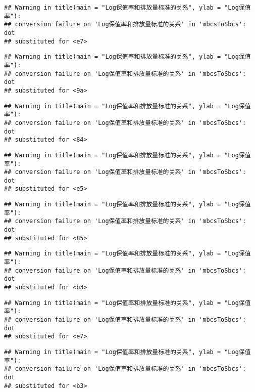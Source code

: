 \documentclass[]{article}
\begin{document}
\begin{verbatim}
## Warning in title(main = "Log保值率和排放量标准的关系", ylab = "Log保值率"):
## conversion failure on 'Log保值率和排放量标准的关系' in 'mbcsToSbcs': dot
## substituted for <e7>
\end{verbatim}

\begin{verbatim}
## Warning in title(main = "Log保值率和排放量标准的关系", ylab = "Log保值率"):
## conversion failure on 'Log保值率和排放量标准的关系' in 'mbcsToSbcs': dot
## substituted for <9a>
\end{verbatim}

\begin{verbatim}
## Warning in title(main = "Log保值率和排放量标准的关系", ylab = "Log保值率"):
## conversion failure on 'Log保值率和排放量标准的关系' in 'mbcsToSbcs': dot
## substituted for <84>
\end{verbatim}

\begin{verbatim}
## Warning in title(main = "Log保值率和排放量标准的关系", ylab = "Log保值率"):
## conversion failure on 'Log保值率和排放量标准的关系' in 'mbcsToSbcs': dot
## substituted for <e5>
\end{verbatim}

\begin{verbatim}
## Warning in title(main = "Log保值率和排放量标准的关系", ylab = "Log保值率"):
## conversion failure on 'Log保值率和排放量标准的关系' in 'mbcsToSbcs': dot
## substituted for <85>
\end{verbatim}

\begin{verbatim}
## Warning in title(main = "Log保值率和排放量标准的关系", ylab = "Log保值率"):
## conversion failure on 'Log保值率和排放量标准的关系' in 'mbcsToSbcs': dot
## substituted for <b3>
\end{verbatim}

\begin{verbatim}
## Warning in title(main = "Log保值率和排放量标准的关系", ylab = "Log保值率"):
## conversion failure on 'Log保值率和排放量标准的关系' in 'mbcsToSbcs': dot
## substituted for <e7>
\end{verbatim}

\begin{verbatim}
## Warning in title(main = "Log保值率和排放量标准的关系", ylab = "Log保值率"):
## conversion failure on 'Log保值率和排放量标准的关系' in 'mbcsToSbcs': dot
## substituted for <b3>
\end{verbatim}
\end{document}
